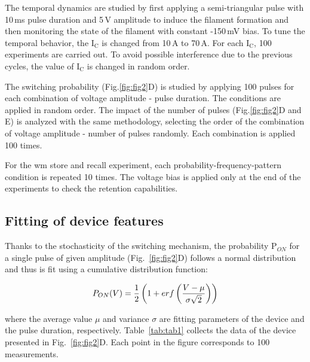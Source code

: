 The temporal dynamics are studied by first applying a semi-triangular pulse with 10\,ms pulse duration and 5\,V amplitude to induce the filament formation and then monitoring the state of the filament with constant -150\,mV bias. To tune the temporal behavior, the I$\mathrm{_C}$ is changed from 10\,\textmu A to 70\,\textmu A. For each I$\mathrm{_C}$, 100 experiments are carried out. To avoid possible interference due to the previous cycles, the value of I$\mathrm{_C}$ is changed in random order.

The switching probability (Fig.\ref{fig:fig2}D) is studied by applying 100 pulses for each combination of voltage amplitude - pulse duration. The conditions are applied in random order. The impact of the number of pulses (Fig.\ref{fig:fig2}D and E) is analyzed with the same methodology, selecting the order of the combination of voltage amplitude - number of pulses randomly. Each combination is applied 100 times.

For the \gls{wm} store and recall experiment, each probability-frequency-pattern condition is repeated 10 times. The voltage bias is applied only at the end of the experiments to check the retention capabilities.

\subsection{Fitting of device features}

Thanks to the stochasticity of the switching mechanism, the probability P$_{ON}$ for a single pulse of given amplitude (Fig.~\ref{fig:fig2}D) follows a normal distribution and thus is fit using a cumulative distribution function:

\begin{equation} 
\label{eqPON}
{\Large\displaystyle{P_{ON}(V) = \frac{1}{2}\left(1+erf\left(\frac{V-\mu}{\sigma\sqrt{2}}\right)\right)}}
\end{equation}

where the average value $\mu$ and variance $\sigma$ are fitting parameters of the device and the pulse duration, respectively. Table~\ref{tab:tab1} collects the data of the device presented in Fig.~\ref{fig:fig2}D. Each point in the figure corresponds to 100 measurements. %


